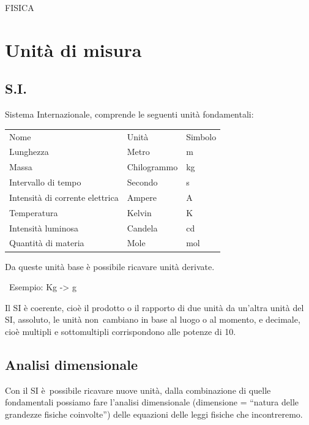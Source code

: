 \documentclass[
]{article}
\author{}
\date{}
\begin{document}
{FISICA}

{}

\section{\texorpdfstring{{Unità }{di
misura}}{Unità di misura}}\label{h.l5wfwwv3cbxn}

\subsection{\texorpdfstring{{S.I.}}{S.I.}}\label{h.hw5gyoas23ps}

{Sistema Internazionale, comprende le seguenti unità fondamentali:}

{}

\begin{longtable}[]{@{}lll@{}}
\toprule\noalign{}
\endhead
\bottomrule\noalign{}
\endlastfoot
{Nome} & {Unità} & {Simbolo} \\
{Lunghezza} & {Metro} & {m} \\
{Massa} & {Chilogrammo} & {kg} \\
{Intervallo di tempo} & {Secondo} & {s} \\
{Intensità di corrente elettrica} & {Ampere} & {A} \\
{Temperatura} & {Kelvin} & {K} \\
{Intensità luminosa} & {Candela} & {cd} \\
{Quantità di materia} & {Mole} & {mol} \\
\end{longtable}

{}

{Da queste unità base è possibile ricavare unità derivate.}

{}

{~Esempio: Kg -\textgreater{} g}

{}

{Il SI è }{coerente}{, cioè il prodotto o il rapporto di due unità da
un'altra unità del SI, }{assoluto}{, le unità }{non}{~}{cambiano in base
al luogo o al momento, e }{decimale}{, cioè multipli e sottomultipli
corrispondono alle potenze di 10.}

\subsection{\texorpdfstring{{Analisi
dimensionale}}{Analisi dimensionale}}\label{h.4b09ywiqwmvv}

{Con il }{SI è}{~possibile ricavare nuove unità, dalla combinazione di
quelle fondamentali possiamo fare l'analisi }{dimensionale }{(dimensione
= ``natura delle grandezze fisiche coinvolte'') delle equazioni delle
leggi fisiche che incontreremo.}
\end{document}
